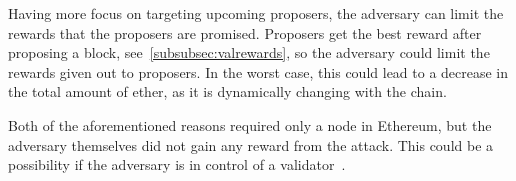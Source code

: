Having more focus on targeting upcoming proposers, the adversary can limit the rewards that the proposers are promised.
Proposers get the best reward after proposing a block, see~\autoref{subsubsec:valrewards}, so the adversary could limit the rewards given out to proposers.
In the worst case, this could lead to a decrease in the total amount of ether, as it is dynamically changing with the chain.


Both of the aforementioned reasons required only a node in Ethereum, but the adversary themselves did not gain any reward from the attack.
This could be a possibility if the adversary is in control of a validator~.